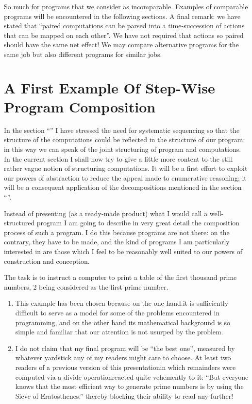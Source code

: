 \documentclass[twoside,11pt]{book}
\begin{document}
So much for programs that we consider as incomparable. Examples of comparable programs will be encountered in the following sections. A final remark: we have stated that ``paired computations can be parsed into a time-succession of actions that can be mapped on each other''. We have not required that actions so paired should have the same net effect! We may compare alternative programs for the same job but also different programs for similar jobs.

\section[A first example of step-wise program composition]{A First Example Of Step-Wise Program Composition}
\label{sec:first-example-step-wise-program-composition}

In the section ``'' I have stressed the need for systematic sequencing so that the structure of the computations could be reflected in the structure of our program: in this way we can speak of the joint structuring of program and computations. In the current section I shall now try to give a little more content to the still rather vague notion of structuring computations. It will be a first effort to exploit our powers of abstraction to reduce the appeal made to enumerative reasoning; it will be a consequent application of the decompositions mentioned in the section ``''.

Instead of presenting (as a ready-made product) what I would call a well-structured program I am going to describe in very great detail the composition process of such a program. I do this because programs are not there: on the contrary, they have to be made, and the kind of programs I am particularly interested in are those which I feel to be reasonably well suited to our powers of construction and conception.

The task is to instruct a computer to print a table of the first thousand prime numbers, 2 being considered as the first prime number.

\begin{enumerate}[leftmargin=*, itemindent=2.2\parindent, label=\textit{Note }\arabic*.]
	\item This example has been chosen because on the one hand.it is sufficiently difficult to serve as a model for some of the problems encountered in programming, and on the other hand its mathematical background is so simple and familiar that our attention is not usurped by the problem.
	
	\item I do not claim that my final program will be ``the best one'', measured by whatever yardstick any of my readers might care to choose. At least two readers of a previous version of this presentation\textemdash{}in which remainders were computed via a divide operation\textemdash{}reacted quite vehemently to it: ``But everyone knows that the most efficient way to generate prime numbers is by using the Sieve of Eratosthenes.'' thereby blocking their ability to read any further!
\end{enumerate}
\end{document}
